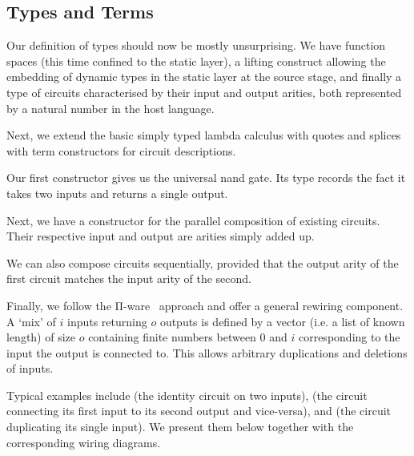 \documentclass{article}
\begin{document}
\subsection{Types and Terms}

Our definition of types should now be mostly unsurprising.
We have function spaces (this time confined to the static
layer), a lifting construct allowing the embedding of
dynamic types in the static layer at the source stage,
and finally a type of circuits characterised by their input
and output arities, both represented by a natural number in
the host language.


Next, we extend the basic simply typed lambda calculus with
quotes and splices with term constructors for circuit descriptions.

Our first constructor gives us the universal nand gate.
Its type records the fact it takes two inputs and returns
a single output.


Next, we have a constructor for the parallel composition
of existing circuits. Their respective input and output
are arities simply added up.


We can also compose circuits sequentially, provided
that the output arity of the first circuit matches
the input arity of the second.


Finally, we follow the Π-ware~\cite{DBLP:conf/types/FlorSS15}
approach and offer a general rewiring component.
A `mix' of $i$ inputs returning $o$ outputs is defined by
a vector (i.e. a list of known length) of size $o$
containing finite numbers between $0$ and $i$
corresponding to the input the output is connected to.
%
This allows arbitrary duplications and deletions
of inputs.



Typical examples include
 (the identity circuit on two inputs),
 (the circuit connecting its first input to its second output and vice-versa),
and  (the circuit duplicating its single input).
We present them below together with the corresponding wiring diagrams.
\end{document}
